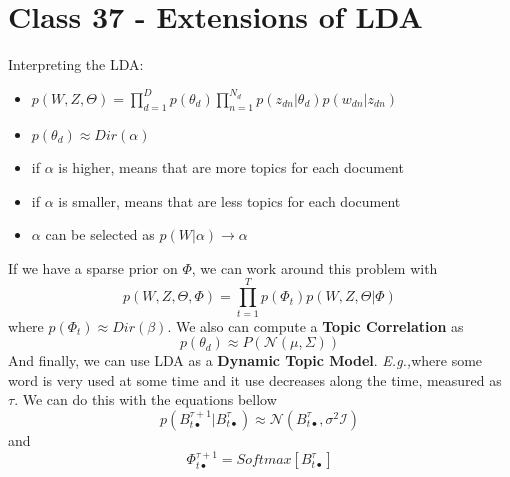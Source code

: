 \documentclass{article}
\newcommand{\Eg}{\textit{E.g.,}}
\begin{document}
\section{Class 37 - Extensions of LDA}
Interpreting the LDA:
\begin{itemize}
    \item $p(W, Z, \Theta) = \prod_{d=1}^D p(\theta_d) \prod_{n=1}^{N_d} p(z_{dn}|\theta_d) p(w_{dn}|z_{dn})$
    \item $p(\theta_d) \approx Dir(\alpha)$
    \item if $\alpha$ is higher, means that are more topics for each document
    \item if $\alpha$ is smaller, means that are less topics for each document
    \item $\alpha$ can be selected as $p(W|\alpha) \rightarrow \alpha$
\end{itemize}
If we have a sparse prior on $\Phi$, we can work around this problem with
\begin{equation}
    p(W, Z, \Theta, \Phi) = \prod_{t=1}^T p(\Phi_t) p(W, Z, \Theta|\Phi)
\end{equation}
where $p(\Phi_t) \approx Dir(\beta)$. We also can compute a \textbf{Topic Correlation} as
\begin{equation}
    p(\theta_d) \approx P( \mathcal{N}(\mu, \Sigma) )
\end{equation}
And finally, we can use LDA as a \textbf{Dynamic Topic Model}. \Eg where some word is very used at some time and it use decreases along the time, measured as $\tau$. We can do this with the equations bellow
\begin{equation}
    p(B_{t\bullet}^{\tau+1}|B_{t\bullet}^{\tau}) \approx \mathcal{N}(B_{t\bullet}^{\tau}, \sigma^2\mathcal{I})
\end{equation}
and
\begin{equation}
    \Phi_{t\bullet}^{\tau+1} = Softmax[B_{t\bullet}^{\tau}]
\end{equation}
\end{document}

